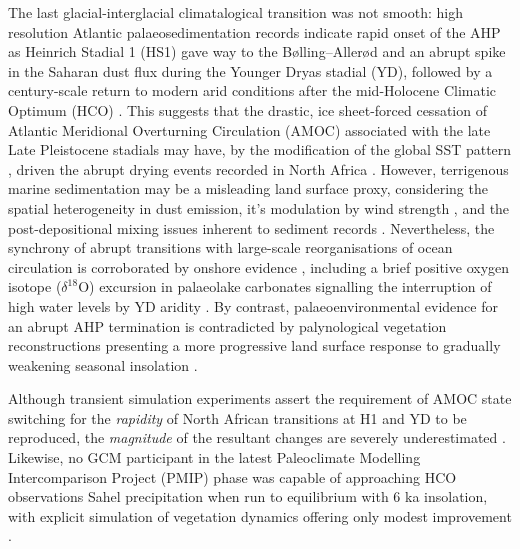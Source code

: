 \documentclass[a4paper]{article}
\newcommand{\delO}{\ensuremath{\delta ^{18}}O}
\begin{document}
The last glacial-interglacial climatalogical transition was not smooth: high resolution Atlantic palaeosedimentation records indicate rapid onset of the AHP as Heinrich Stadial 1 (HS1) gave way to the Bølling–Allerød and an abrupt spike in the Saharan dust flux during the Younger Dryas stadial (YD), followed by a century-scale return to modern arid conditions after the mid-Holocene Climatic Optimum (HCO) \parencite{demenocal2000abrupt, kuhlmann2004transition, adkins2006african, mcgee2013magnitude, ehrmann2013dynamics, collins2013abrupt, williams2016glacial}.
This suggests that the drastic, ice sheet-forced cessation of Atlantic Meridional Overturning Circulation (AMOC) associated with the late Late Pleistocene stadials \parencite{mcmanus2004collapse, lynch2017atlantic, ritz2013estimated} may have, by the modification of the global SST pattern \parencite{boyle1987north, kiefer2005patterns, kienast2006eastern, barker2009interhemispheric}, driven the abrupt drying events recorded in North Africa \parencite{weldeab2007155, mulitza2008sahel, collins2013abrupt}. 
However, terrigenous marine sedimentation may be a misleading land surface proxy, considering the spatial heterogeneity in dust emission, it's modulation by wind strength \parencite{ruddiman1997tropical, mcgee2010gustiness, parker2016new}, and the post-depositional mixing issues inherent to sediment records \parencite{mahowald1999dust, giresse2003late, maslin2003evidence}.
Nevertheless, the synchrony of abrupt transitions with large-scale reorganisations of ocean circulation is corroborated by onshore evidence \parencite{gasse1994abrupt, garcin2007abrupt, talbot2007abrupt}, including a brief positive oxygen isotope (\delO) excursion in palaeolake carbonates signalling the interruption of high water levels by YD aridity \parencite{gasse1990arid}.
By contrast, palaeoenvironmental evidence for an abrupt AHP termination \parencite{gasse1990arid, salzmann2005dahomey, tierney2013abrupt, tierney2017rainfall} is contradicted by palynological vegetation reconstructions presenting a more progressive land surface response to gradually weakening seasonal insolation \parencite{kropelin2008climate, lezine2009timing, vincens2010vegetation, amaral2013palynological, shanahan2015time}. 

Although transient simulation experiments assert the requirement of AMOC state switching for the \emph{rapidity} of North African transitions at H1 and YD to be reproduced, the \emph{magnitude} of the resultant changes are severely underestimated \parencite{timm2010mechanisms, otto2014coherent}. 
Likewise, no GCM participant in the latest Paleoclimate Modelling Intercomparison Project (PMIP) phase was capable of approaching HCO observations Sahel precipitation when run to equilibrium with 6 ka insolation, with explicit simulation of vegetation dynamics offering only modest improvement \parencite{braconnot2012evaluation, zheng2013characterization, harrison2015evaluation}.
\end{document}
